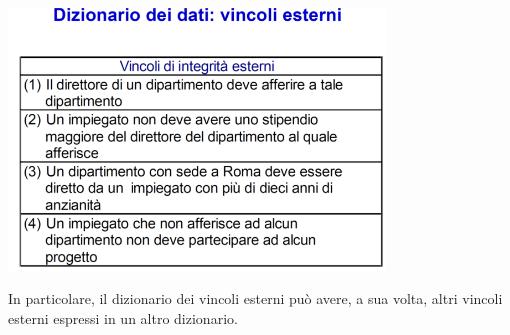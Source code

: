 \documentclass[12pt]{article}
\begin{document}
\begin{center}
    \includegraphics[width = 0.75\textwidth]{Images/43.PNG}
\end{center}
In particolare, il dizionario dei vincoli esterni può avere, a sua volta, altri vincoli esterni espressi in un altro dizionario.
\end{document}
